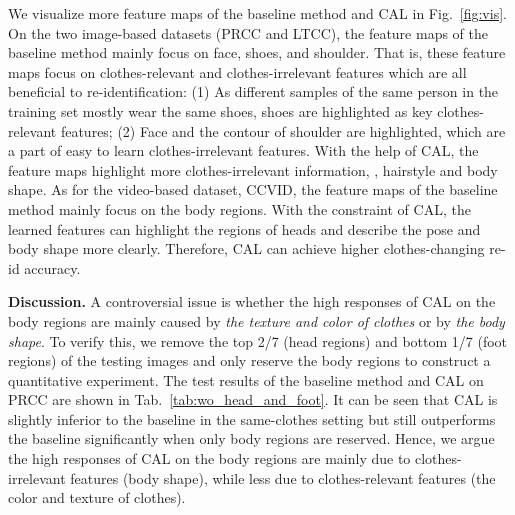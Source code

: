 \documentclass[10pt,twocolumn,letterpaper]{article}
\begin{document}
We visualize more feature maps of the baseline method and CAL in Fig.~\ref{fig:vis}.
On the two image-based datasets (\ie PRCC and LTCC), the feature maps of the baseline method mainly focus on face, shoes, and shoulder.
That is, these feature maps focus on clothes-relevant and clothes-irrelevant features which are all beneficial to re-identification: (1) As different samples of the same person in the training set mostly wear the same shoes, shoes are highlighted as key clothes-relevant features; (2) Face and the contour of shoulder are highlighted, which are a part of easy to learn clothes-irrelevant features.
With the help of CAL, the feature maps highlight more clothes-irrelevant information, \eg, hairstyle and body shape.
As for the video-based dataset, \ie CCVID, the feature maps of the baseline method mainly focus on the body regions.
With the constraint of CAL, the learned features can highlight the regions of heads and describe the pose and body shape more clearly.
Therefore, CAL can achieve higher clothes-changing re-id accuracy.


\medskip
\noindent
\textbf{Discussion.}
A controversial issue is whether the high responses of CAL on the body regions are mainly caused by \emph{the texture and color of clothes} or by \emph{the body shape}.
To verify this, we remove the top 2/7 (head regions) and bottom 1/7 (foot regions) of the testing images and only reserve the body regions to construct a quantitative experiment.
The test results of the baseline method and CAL on PRCC are shown in Tab.~\ref{tab:wo_head_and_foot}.
It can be seen that CAL is slightly inferior to the baseline in the same-clothes setting but still outperforms the baseline significantly when only body regions are reserved.
Hence, we argue the high responses of CAL on the body regions are mainly due to clothes-irrelevant features (body shape), while less due to clothes-relevant features (the color and texture of clothes).

\begin{table}[t]
	\centering
	\caption{The results with only body regions as inputs on PRCC.}
	\vspace{-20pt}
	\small
	\begin{center}
	\end{center}
	\vspace{-15pt}
	\label{tab:wo_head_and_foot}
\end{table}
\end{document}
